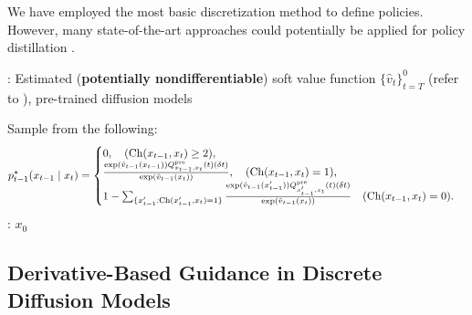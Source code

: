 \begin{remark}
We have employed the most basic discretization method to define policies. However, many state-of-the-art approaches could potentially be applied for policy distillation \citep{campbell2022continuous,ren2024discrete,zhao2024informed}.
\end{remark}


\begin{algorithm}[!th]
\caption{Classifier Guidance in Discrete Diffusion Models \citep{nisonoff2024unlocking} }\label{alg:claasify_dscrete}
\begin{algorithmic}[1]
     : Estimated (\textbf{potentially nondifferentiable}) soft value function $\{\hat v_t\}_{t=T}^0$ (refer to ), pre-trained diffusion models 
     
        \STATE Sample from the following: 
        \begin{align*}
      p^{\star}_{t-1}(x_{t-1} \mid x_t)=\begin{cases}
          0, \quad  (\mathrm{Ch}(x_{t-1}, x_{t}) \geq  2), \\
       \frac{\exp(\hat v_{t-1}(x_{t-1})) Q^{\mathrm{pre}}_{x_{t-1},x_t}(t)  (\delta t)}{\exp(\hat v_{t-1}(x_{t})) }, \quad    (\mathrm{Ch}(x_{t-1}, x_{t}) =1),  \\
            1-  \sum_{\{ x'_{t-1}: \mathrm{Ch}(x'_{t-1}, x_{t})=1\}  }\frac{\exp(\hat v_{t-1}(x'_{t-1})) Q^{\mathrm{pre}}_{x'_{t-1},x_t}(t)  (\delta t)}{\exp(\hat v_{t-1}(x_{t})) }
            \quad    (\mathrm{Ch}(x_{t-1}, x_{t}) =0).  
      \end{cases}
\end{align*}
     \ENDFOR
  : $x_0$
\end{algorithmic}
\end{algorithm}




\subsection{Derivative-Based Guidance in Discrete Diffusion Models}\label{sec:derivative_discrete2}


